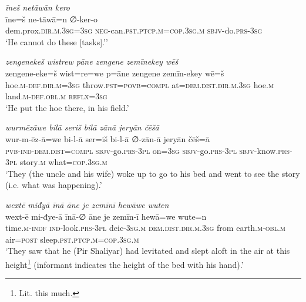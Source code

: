 \ea \label{ŽP.49}
\textit{īneš netāwān kero} \\ 
\gll īne=š ne-tāwā=n ∅-ker-o \\ 
 dem.prox\textsc{.dir}\textsc{.m}\textsc{.3sg}\textsc{=3sg} \textsc{neg-}can\textsc{.pst}\textsc{.ptcp}\textsc{.m}\textsc{=cop}\textsc{.3sg}\textsc{.m} \textsc{sbjv-}do\textsc{.prs}\textsc{-3sg} \\ 
\glt `He cannot do these [tasks].’'
\z 
 
\ea \label{ŽP.52}
\textit{zengenekeš wistrew pāne zengene zemīnekey wēš} \\ 
\gll zengene-eke=š wist=re=we p=āne zengene zemīn-ekey wē=š \\ 
 hoe\textsc{.m}\textsc{-def}\textsc{.dir}\textsc{.m}\textsc{=3sg} throw\textsc{.pst}\textsc{=\textsc{povb}}\textsc{=compl} at=\textsc{dem.dist}\textsc{.dir}\textsc{.m}\textsc{.3sg} hoe\textsc{.m} land\textsc{.m}\textsc{-def}\textsc{.obl}\textsc{.m} \textsc{reflx}\textsc{=3sg} \\ 
\glt `He put the hoe there, in his field.'
\z 
 
\ea \label{ŽP.67}
\textit{wurmēzāwe bilā seriš bilā zānā jeryān čēšā} \\ 
\gll wur-m-ēz-ā=we bi-l-ā ser=iš bi-l-ā ∅-zān-ā jeryān čēš=ā \\ 
 \textsc{pvb-}\textsc{ind-}\textsc{dem.dist}\textsc{=compl} \textsc{sbjv-}go\textsc{.prs}\textsc{-3pl} on\textsc{=3sg} \textsc{sbjv-}go\textsc{.prs}\textsc{-3pl} \textsc{sbjv-}know\textsc{.prs}\textsc{-3pl} story\textsc{.m} what\textsc{=cop}\textsc{.3sg}\textsc{.m} \\ 
\glt `They (the uncle and his wife) woke up to go to his bed and went to see the story (i.e. what was happening).'
\z 
 
\ea \label{ŽP.68}
\textit{wextē miđyā īnā āne je zemīnī hewāwe wuten} \\ 
\gll wext-ē mi-đye-ā īnā-∅ āne je zemīn-ī hewā=we wute=n \\ 
 time\textsc{.m}\textsc{-indf} \textsc{ind-}look\textsc{.prs}\textsc{-3pl} deic\textsc{-3sg}\textsc{.m} \textsc{dem.dist}\textsc{.dir}\textsc{.m}\textsc{.3sg} from earth\textsc{.m}\textsc{-obl}\textsc{.m} air\textsc{=\textsc{post}} sleep\textsc{.pst}\textsc{.ptcp}\textsc{.m}\textsc{=cop}\textsc{.3sg}\textsc{.m} \\ 
\glt `They saw that he (Pir Shaliyar) had levitated and slept aloft in the air at this height\footnote{Lit. this much.} (informant indicates the height of the bed with his hand).'
\z 
 
